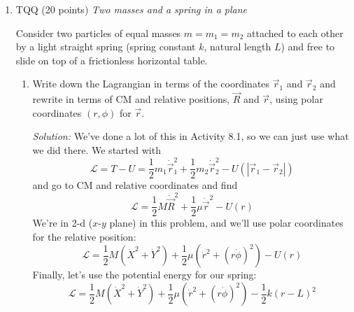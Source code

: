 \documentclass[12pt]{article}
\newcommand{\soln}[2] {\textit{Solution:} #2}
\begin{document}
\begin{enumerate}
\begin{enumerate}
                  \item
                        What would be the orbital period if Earth was replaced by a star of mass equal to the solar mass, with in a circular orbit, with the distance between the Sun and the star equal to the present earth-sun distance? (The mass of the sun is more than 300,000
                        $\times$ that of Earth.)

                        \soln{12em}
                        {
                              If $m_1 = m_2$, then $M = 2m_2$, so $\omega = \sqrt{\frac{G2m_2}{r^3}} = \sqrt{2}\sqrt{\frac{Gm_2}{r^3}}$. The frequency is higher by $\sqrt{2}$, ie., the period shorter by $1/\sqrt{2}$.
                        }

            \end{enumerate}

            \clearpage
      \item TQQ (20 points) \textit{Two masses and a spring in a plane}

            Consider two particles of equal masses $m = m_1 = m_2$ attached to each other by a light straight spring (spring constant $k$, natural length $L$) and free to slide on top of a frictionless horizontal table.

            \begin{enumerate}
                  \item Write down the Lagrangian in terms of the coordinates $\vec r_1$ and $\vec r_2$ and rewrite in terms of CM and relative positions, $\vec R$ and $\vec r$, using polar coordinates $(r, \phi)$ for $\vec r$.

                        \soln{12em}
                        {
                              We've done a lot of this in Activity 8.1, so we can just use what we did there. We started with
                              $$
                                    \mathcal{L} = T - U = \frac{1}{2}m_1 \dot \vec r_1^2 + \frac{1}{2}m_2 \dot \vec r_2^2 - U(|\vec r_1 - \vec r_2|)
                              $$
                              and go to CM and relative coordinates and find
                              $$
                                    \mathcal{L} = \frac{1}{2}M \dot{\vec R}^2 + \frac{1}{2}\mu \dot{\vec r}^2 - U(r)
                              $$
                              We're in 2-d ($x$-$y$ plane) in this problem, and we'll use polar coordinates for the relative position:
                              $$
                                    \mathcal{L} = \frac{1}{2}M (\dot X^2 + \dot Y^2) + \frac{1}{2}\mu (\dot r^2 + (r\dot\phi)^2) - U(r)
                              $$
                              Finally, let's use the potential energy for our spring:
                              $$
                                    \mathcal{L} = \frac{1}{2}M (\dot X^2 + \dot Y^2) + \frac{1}{2}\mu (\dot r^2 + (r\dot\phi)^2) - \frac{1}{2}k (r - L)^2
                              $$

}
\end{enumerate}
\end{enumerate}
\end{document}
